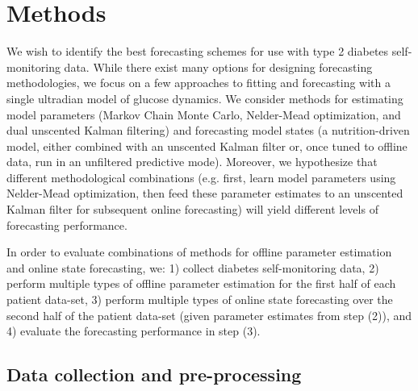 \documentclass[10pt,letterpaper]{article}
\begin{document}
\section{Methods}

We wish to identify the best forecasting schemes for use with type 2 diabetes self-monitoring data. While there exist many options for designing forecasting methodologies, we focus on a few approaches to fitting and forecasting with a single ultradian model of glucose dynamics. We consider methods for estimating model parameters (Markov Chain Monte Carlo, Nelder-Mead optimization, and dual unscented Kalman filtering) and forecasting model states (a nutrition-driven model, either combined with an unscented Kalman filter or, once tuned to offline data, run in an unfiltered predictive mode). Moreover, we hypothesize that different methodological combinations (e.g. first, learn model parameters using Nelder-Mead optimization, then feed these parameter estimates to an unscented Kalman filter for subsequent online forecasting) will yield different levels of forecasting performance.

In order to evaluate combinations of methods for offline parameter estimation and online state forecasting, we: 1) collect diabetes self-monitoring data, 2) perform multiple types of offline parameter estimation for the first half of each patient data-set, 3) perform multiple types of online state forecasting over the second half of the patient data-set (given parameter estimates from step (2)), and 4) evaluate the forecasting performance in step (3).

\subsection{Data collection and pre-processing}
\end{document}
